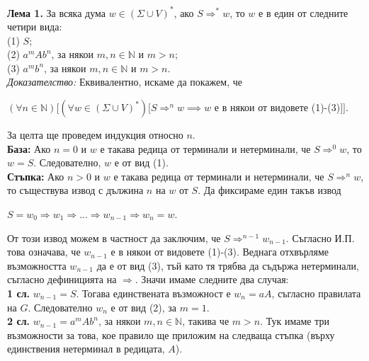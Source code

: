 \documentclass{article}
\begin{document}
    \hspace{15pt}\textbf{Лема 1.} За всяка дума $w \in (\Sigma \cup V)^*$, ако 
    $S \Rightarrow^* w$, то $w$ е в един от следните четири вида: \\
    (1) $S$; \\
    (2) $a^mAb^n$, за някои $m,n \in \mathbb{N}$ и $m > n$;\\
    (3) $a^mb^n$, за някои $m,n \in \mathbb{N}$ и $m > n$. \\
    \textit{Доказателство:} Еквивалентно, искаме да покажем, че \\
    \begin{center}
        $(\forall n \in \mathbb{N})[(\forall w \in (\Sigma \cup V)^*)[S \Rightarrow^n w \implies w$ е в някои от видовете (1)-(3)$]]$.
    \end{center}
        За целта ще проведем индукция относно $n$. \\
        \vspace{5pt}
        \textbf{База:} Ако $n = 0$ и $w$ е такава редица от терминали и нетерминали, че
        $S \Rightarrow^0 w$, то $w = S$. Следователно, $w$ е от вид (1). \\
        \vspace{5pt}
        \textbf{Стъпка:} Ако $n > 0$ и $w$ е такава редица от терминали и нетерминали,
        че $S \Rightarrow^n w$, то съществува извод с дължина $n$ на $w$ от $S$. Да 
        фиксираме един такъв извод \\
        \begin{center}
            $S = w_0 \Rightarrow w_1 \Rightarrow ... \Rightarrow w_{n-1} \Rightarrow w_n = w$.
        \end{center}
        От този извод можем в частност да заключим, че $S \Rightarrow^{n-1} w_{n-1}$. 
        Съгласно И.П. това означава, че $w_{n-1}$ е в някои от видовете (1)-(3). Веднага
        отхвърляме възможността $w_{n-1}$ да е от вид (3), тъй като тя трябва да съдържа
        нетерминали, съгласно дефиницията на $\Rightarrow$. Значи имаме следните два
        случая: \\
        \textbf{1 сл.} $w_{n-1} = S$. Тогава единствената възможност е $w_n = aA$, съгласно
        правилата на $G$. Следователно $w_n$ е от вид (2), за $m = 1$. \\
        \textbf{2 сл.} $w_{n-1} = a^mAb^n$, за някои $m,n \in \mathbb{N}$, такива че
        $m > n$. Тук имаме три
        възможности за това, кое правило ще приложим на следваща стъпка (върху 
        единствения нетерминал в редицата, $A$). \\
\end{document}
